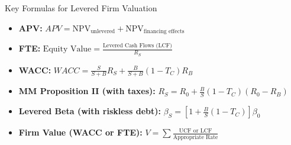 \begin{frame}{Key Formulas for Levered Firm Valuation}
	\small
	\begin{itemize}
		\item \textbf{APV:} $ \displaystyle APV = \text{NPV}_{\text{unlevered}} + \text{NPV}_{\text{financing effects}} $
		
		\item \textbf{FTE:} $ \displaystyle \text{Equity Value} = \frac{\text{Levered Cash Flows (LCF)}}{R_S} $
		
		\item \textbf{WACC:} $ \displaystyle WACC = \frac{S}{S + B} R_S + \frac{B}{S + B}(1 - T_C) R_B $
		
		\item \textbf{MM Proposition II (with taxes):} 
		$ \displaystyle R_S = R_0 + \frac{B}{S}(1 - T_C)(R_0 - R_B) $
		
		\item \textbf{Levered Beta (with riskless debt):} 
		$ \displaystyle \beta_S = \left[1 + \frac{B}{S}(1 - T_C)\right] \beta_0 $
		
		\item \textbf{Firm Value (WACC or FTE):} 
		$ \displaystyle V = \sum \frac{\text{UCF or LCF}}{\text{Appropriate Rate}} $
	\end{itemize}
\end{frame}
